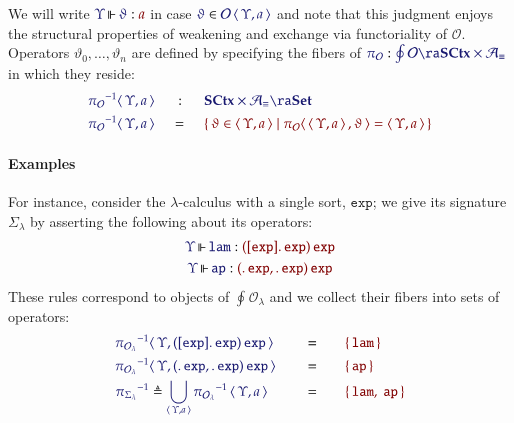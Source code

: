\documentclass[11pt]{article}
\theoremstyle{definition}
\theoremstyle{remark}
\numberwithin{equation}{section}
\def\IModeColorName{MidnightBlue}
\def\OModeColorName{Maroon}
\newcommand\IMode[1]{{\color{\IModeColorName}{#1}}}
\newcommand\OMode[1]{{\color{\OModeColorName}{#1}}}
\newcommand\MkSet[1]{\left\{\,#1\,\right\}}
\newcommand\Member[2]{\IMode{#1}\in\IMode{#2}}
\newcommand\Of[2]{\IMode{#1}: \IMode{#2}}
\newcommand\MkValence[3]{%
  \ifthenelse{\equal{#1}{}}{}{%
    \{#1\}%
  }%
  \ifthenelse{\equal{#2}{}}{}{%
    [#2]%
  }.\, #3%
}
\newcommand\MkArity[2]{(#1)\, #2}
\newcommand\Arities{\mathcal{A}}
\newcommand\Operators{\mathcal{O}}
\newcommand\Discrete[1]{#1_{\equiv}}
\newcommand\Sets{\mathbf{Set}}
\newcommand\SCtx{\mathbf{SCtx}}
\newcommand\IsOperator[3]{
  \IMode{#1}\,{\Vdash}\,\IMode{#2}: \OMode{#3}
}
\newcommand\Grothendieck[2]{\oint^{#1} #2#1}
\newcommand\Pair[2]{\left\langle\,#1,#2\,\right\rangle}
\newcommand\SortExp{\mathtt{exp}}
\begin{document}
We will write $\IsOperator{\Upsilon}{\vartheta}{a}$ in case
$\Member{\vartheta}{\Operators\Pair{\Upsilon}{a}}$ and note that this judgment
enjoys the structural properties of weakening and exchange via functoriality of
$\Operators$. Operators $\vartheta_{0}, \ldots, \vartheta_{n}$ are defined by
specifying the fibers of
$\Of{\pi_{\Operators}}{\Grothendieck{}{\Operators}\ra\SCtx\times\Discrete{\Arities}}$
in which they reside:
\begin{alignat*}{3}
  \null
&
  \IMode{{\pi_{\Operators}}^{-1}{\Pair{\Upsilon}{a}}}
&&
  \,\mathrel{\ {{:}}}\,
&&
  \IMode{\SCtx\times\Discrete{\Arities}\ra\Sets}
\\
  \null
&
  \IMode{{\pi_{\Operators}}^{-1}{\Pair{\Upsilon}{a}}}
&&
  \,=\,\
&&
    \OMode{
      \MkSet{
        \vartheta\in\Pair{\Upsilon}{a}
        \mid{\pi_{\Operators}}{\Pair{\Pair{\Upsilon}{a}}{\vartheta}} =
        \Pair{\Upsilon}{a}
      }
    }
\end{alignat*}

\paragraph{Examples}

For instance, consider the $\lambda$-calculus with a single sort, $\SortExp$; we
give its signature $\Sigma_{\lambda}$ by asserting the following about its
operators:
\begin{gather*}
  \IsOperator{\Upsilon}{\mathtt{lam}}{
    \MkArity{
      \MkValence{}{\SortExp}{\SortExp}
    }{\SortExp}
  }
\\
  \IsOperator{\Upsilon}{\mathtt{ap}}{
    \MkArity{
      \MkValence{}{}{\SortExp},
      \MkValence{}{}{\SortExp}
    }{\SortExp}
  }
\end{gather*}
These rules correspond to objects of $\Grothendieck{}{{\Operators}_{\lambda}}$
and we collect their fibers into sets of operators:
\begin{alignat*}{5}
  \IMode{{\pi_{{\Operators}_{\lambda}}}^{-1}}
&
  \IMode{
    \Pair{
      \Upsilon
    }{
      \MkArity{
        \MkValence{}{\SortExp}{\SortExp}
      }{\SortExp}
    }
  }
\quad
&&
  =
&&
\quad
  \OMode{\MkSet{\mathtt{lam}}}
\\
  \IMode{{\pi_{{\Operators}_{\lambda}}}^{-1}}
&
  \IMode{
    \Pair{
      \Upsilon
    }{
      \MkArity{
        \MkValence{}{}{\SortExp},
        \MkValence{}{}{\SortExp}
      }{\SortExp}
    }
  }
\quad
&&
  =
&&
\quad
  \OMode{\MkSet{\mathtt{ap}}}
\\
  \IMode{{\pi_{{\Sigma}_{\lambda}}}^{-1}}
&
  \triangleq\IMode{
    \bigcup_{\Pair{\Upsilon}{a}}{
      {\pi_{{\Operators}_{\lambda}}}^{-1}
      \Pair{\Upsilon}{a}
    }
  }
\quad
&&
  =
&&
\quad
  \OMode{
    \MkSet{\mathtt{lam},\ \mathtt{ap}}
  }
\\
\end{alignat*}
\end{document}
